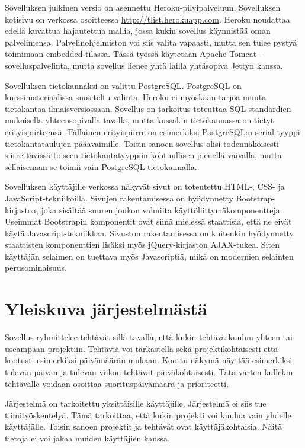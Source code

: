 \documentclass[12pt,a4paper,oneside,titlepage,pdftex]{article}
\begin{document}
Sovelluksen julkinen versio on asennettu Heroku\hyp{}pilvipalveluun. Sovelluksen kotisivu on verkossa osoitteessa \url{http://tlist.herokuapp.com}. Heroku noudattaa edellä kuvattua hajautettua mallia, jossa kukin sovellus käynnistää oman palvelimensa. Palvelinohjelmiston voi siis valita vapaasti, mutta sen tulee pystyä toimimaan embedded-tilassa. Tässä työssä käytetään Apache Tomcat -sovelluspalvelinta, mutta sovellus lienee yhtä lailla yhtäsopiva Jettyn kanssa.

Sovelluksen tietokannaksi on valittu PostgreSQL. PostgreSQL on kurssimateriaalissa suositeltu valinta. Heroku ei myöskään tarjoa muuta tietokantaa ilmaisversiossaan. Sovellus on tarkoitus toteuttaa SQL-standardien mukaisella yhteensopivalla tavalla, mutta kussakin tietokannassa on tietyt erityispiirteensä. Tällainen erityispiirre on esimerkiksi PostgreSQL:n serial-tyyppi tietokantataulujen pääavaimille. Toisin sanoen sovellus olisi todennäköisesti siirrettävissä toiseen tietokantatyyppiin kohtuullisen pienellä vaivalla, mutta sellaisenaan se toimii vain PostgreSQL-tietokannalla.

Sovelluksen käyttäjille verkossa näkyvät sivut on toteutettu HTML-, CSS- ja JavaScript-tekniikoilla. Sivujen rakentamisessa on hyödynnetty Bootstrap-kirjastoa, joka sisältää suuren joukon valmiita käyttöliittymäkomponentteja. Useimmat Bootstrapin komponentit ovat siinä mielessä staattisia, että ne eivät käytä Javascript-tekniikkaa. Sivuston rakentamisessa on kuitenkin hyödynnetty staattisten komponenttien lisäksi myös jQuery-kirjaston AJAX-tukea. Siten käyttäjän selaimen on tuettava myös Javascriptiä, mikä on modernien selainten perusominaisuus.

\section{Yleiskuva järjestelmästä}

Sovellus ryhmittelee tehtävät sillä tavalla, että kukin tehtävä kuuluu yhteen tai useampaan projektiin. Tehtäviä voi tarkastella sekä projektikohtaisesti että kootusti esimerkiksi päivämäärän mukaan. Koottu näkymä näyttää esimerkiksi tulevan päivän ja tulevan viikon tehtävät päiväkohtaisesti. Tätä varten kullekin tehtävälle voidaan osoittaa suorituspäivämäärä ja prioriteetti.

Järjestelmä on tarkoitettu yksittäisille käyttäjille. Järjestelmä ei siis tue tiimityöskentelyä. Tämä tarkoittaa, että kukin projekti voi kuulua vain yhdelle käyttäjälle. Toisin sanoen projektit ja tehtävät ovat käyttäjäkohtaisia. Näitä tietoja ei voi jakaa muiden käyttäjien kanssa.
\end{document}
